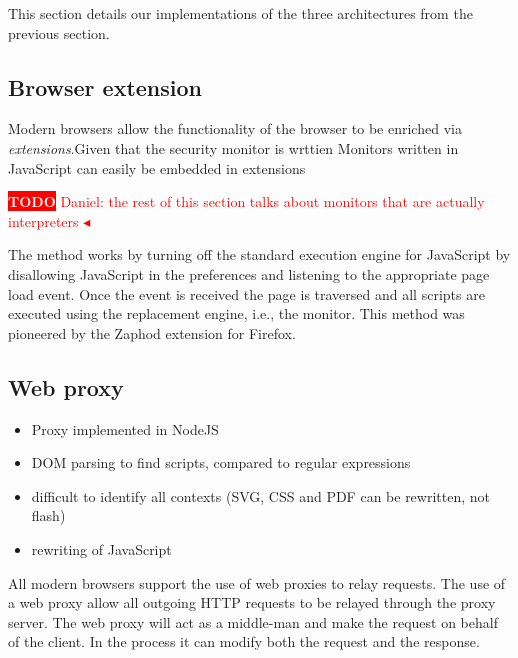 \documentclass{llncs}
\newcommand{\todo}[1]{\colorbox{red}{\textcolor{white}{\sffamily\bfseries\scriptsize TODO}} \textcolor{red}{#1} \textcolor{red}{$\blacktriangleleft$}}
\begin{document}
This section details our implementations of the three architectures
from the previous section. 


\subsection{Browser extension}

Modern browsers allow the functionality of the browser to be enriched via
\emph{extensions}.Given that
the security monitor is wrttien
Monitors written in JavaScript can easily be embedded in extensions

\todo{Daniel: the rest of this section talks about monitors that are actually interpreters}

The method works by turning off the standard execution engine for JavaScript
by disallowing JavaScript in the preferences and listening to the appropriate
page load event. Once the event is received the page is traversed and all
scripts are executed using the replacement engine, i.e., the monitor. This
method was pioneered by the Zaphod \cite{Zaphod} extension for Firefox.



\subsection{Web proxy}

\begin{itemize}
\item Proxy implemented in NodeJS
\item DOM parsing to find scripts, compared to regular expressions
\item difficult to identify all contexts (SVG, CSS and PDF can be rewritten, not flash)
\item rewriting of JavaScript
\end{itemize}

All modern browsers support the use of web proxies to relay requests.
The use of a web proxy allow all outgoing HTTP requests to be 
relayed through the proxy server. The web proxy will act as a middle-man and make 
the request on behalf of the client. In the process it can modify both the 
request and the response. 
\end{document}
